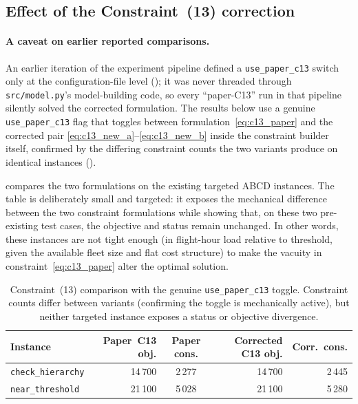 \subsection{Effect of the Constraint~(13) correction}
\label{subsec:comp_c13}

\paragraph{A caveat on earlier reported comparisons.}
An earlier iteration of the experiment pipeline defined a \texttt{use\_paper\_c13}
switch only at the configuration-file level
(); it was never threaded
through \texttt{src/model.py}'s model-building code, so every ``paper-C13''
run in that pipeline silently solved the corrected formulation. The results
below use a genuine \texttt{use\_paper\_c13} flag that toggles between
formulation~\eqref{eq:c13_paper} and the corrected pair
\eqref{eq:c13_new_a}--\eqref{eq:c13_new_b} inside the constraint builder
itself, confirmed by the differing constraint counts the two variants
produce on identical instances ().

 compares the two formulations on the existing
targeted ABCD instances.  The table is deliberately small and targeted: it
exposes the mechanical difference between the two constraint formulations
while showing that, on these two pre-existing test cases, the objective and
status remain unchanged.  In other words, these instances are not tight
enough (in flight-hour load relative to threshold, given the available fleet
size and flat cost structure) to make the vacuity in
constraint~\eqref{eq:c13_paper} alter the optimal solution.

\begin{table}[t]
\centering\small
\caption{Constraint~(13) comparison with the genuine \texttt{use\_paper\_c13}
  toggle. Constraint counts differ between variants (confirming the toggle is
  mechanically active), but neither targeted instance exposes a status or
  objective divergence.}
\label{tab:c13_comparison}
\begin{tabular}{@{}lrcrr@{}}
\toprule
Instance & Paper~C13 obj. & Paper cons. & Corrected C13 obj. & Corr.\ cons. \\
\midrule
\texttt{check\_hierarchy} & 14\,700 & 2\,277 & 14\,700 & 2\,445 \\
\texttt{near\_threshold} & 21\,100 & 5\,028 & 21\,100 & 5\,280 \\
\bottomrule
\end{tabular}
\end{table}

